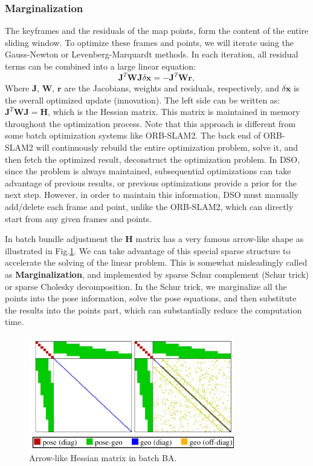 \documentclass[a4paper,10pt]{article}
\begin{document}
	\subsubsection{Marginalization}
	The keyframes and the residuals of the map points, form the content of the entire sliding window. To optimize these frames and points, we will iterate using the Gauss-Newton or Levenberg-Marquardt methods. In each iteration, all residual terms can be combined into a large linear equation:
	\begin{equation}
	\mathbf{J}^T \mathbf{W} \mathbf{J} \delta \mathbf{x}=-\mathbf{J}^T \mathbf{W} \mathbf{r},
	\end{equation}
	Where $\mathbf{J}$, $\mathbf{W}$, $\mathbf{r}$ are the Jacobians, weights and residuals, respectively, and $\delta \mathbf{x}$ is the overall optimized update (innovation). The left side can be written as: $\mathbf{J}^T \mathbf{WJ}=\mathbf{H}$, which is the Hessian matrix. This matrix is maintained in memory throughout the optimization process. Note that this approach is different from some batch optimization systems like ORB-SLAM2. The back end of ORB-SLAM2 will continuously rebuild the entire optimization problem, solve it, and then fetch the optimized result, deconstruct the optimization problem. In DSO, since the problem is always maintained, subsequential optimizations can take advantage of previous results, or previous optimizations provide a prior for the next step. However, in order to maintain this information, DSO must manually add/delete each frame and point, unlike the ORB-SLAM2, which can directly start from any given frames and points.
	
	In batch bundle adjustment the $\mathbf{H}$ matrix has a very famous arrow-like shape as illustrated in Fig.\ref{fig:H-dso}. We can take advantage of this special sparse structure to accelerate the solving of the linear problem. This is somewhat misleadingly called as \textbf{Marginalization}, and implemented by sparse Schur complement (Schur trick) or sparse Cholesky decomposition. In the Schur trick, we marginalize all the points into the pose information, solve the pose equations, and then substitute the results into the points part, which can substantially reduce the computation time. 
	
	\begin{figure}[!thp]
		\centering
		\includegraphics[width=0.8\textwidth]{figs/H.jpg}
		\caption{Arrow-like Hessian matrix in batch BA.}
		\label{fig:H-dso}
	\end{figure}
		
\end{document}
